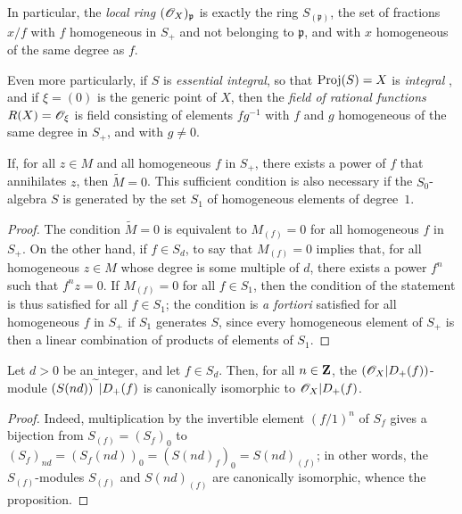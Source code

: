 In particular, the \emph{local ring $(\mathscr{O}_X)_\mathfrak{p}$} is exactly the ring $S_{(\mathfrak{p})}$, the set of fractions $x/f$ with $f$ homogeneous in $S_+$ and not belonging to $\mathfrak{p}$, and with $x$ homogeneous of the same degree as $f$.

Even more particularly, if $S$ is \emph{essential integral}, so that $\operatorname{Proj}(S)=X$ is \emph{integral} , and if $\xi=(0)$ is the generic point of $X$, then the \emph{field of rational functions $R(X)=\mathscr{O}_\xi$} is field consisting of elements $fg^{-1}$ with $f$ and $g$ homogeneous of the same degree in $S_+$, and with $g\neq 0$.

\begin{proposition}[2.5.6]
\label{II.2.5.6}
If, for all $z\in M$ and all homogeneous $f$ in $S_+$, there exists a power of $f$ that annihilates $z$, then $\widetilde{M}=0$.
This sufficient condition is also necessary if the $S_0$-algebra $S$ is generated by the set $S_1$ of homogeneous elements of degree~$1$.
\end{proposition}

\begin{proof}
The condition $\widetilde{M}=0$ is equivalent to $M_{(f)}=0$ for all homogeneous $f$ in $S_+$.
On the other hand, if $f\in S_d$, to say that $M_{(f)}=0$ implies that, for all homogeneous $z\in M$ whose degree is some multiple of $d$, there exists a power $f^n$ such that $f^nz=0$.
If $M_{(f)}=0$ for all $f\in S_1$, then the condition of the statement is thus satisfied for all $f\in S_1$;
the condition is \emph{a fortiori} satisfied for all homogeneous $f$ in $S_+$ if $S_1$ generates $S$, since every homogeneous element of $S_+$ is then a linear combination of products of elements of $S_1$.
\end{proof}

\begin{proposition}[2.5.7]
\label{II.2.5.7}
Let $d>0$ be an integer, and let $f\in S_d$.
Then, for all $n\in\mathbf{Z}$, the $(\mathscr{O}_X|D_+(f))$-module $(S(nd))^{\,\widetilde{\,}\,}|D_+(f)$ is canonically isomorphic to $\mathscr{O}_X|D_+(f)$.
\end{proposition}

\begin{proof}
Indeed, multiplication by the invertible element $(f/1)^n$ of $S_f$ gives a bijection from $S_{(f)}=(S_f)_0$ to $(S_f)_{nd}=(S_f(nd))_0=(S(nd)_f)_0=S(nd)_{(f)}$;
in other words, the $S_{(f)}$-modules $S_{(f)}$ and $S(nd)_{(f)}$ are canonically isomorphic, whence the proposition.
\end{proof}

